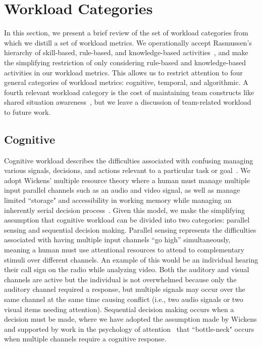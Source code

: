 \section{Workload Categories}

In this section, we present a brief review of the set of workload categories from which we distill a set of workload metrics.  We operationally accept Rasmussen's hierarchy of skill-based, rule-based, and knowledge-based activities~\cite{Rasmussen83}, and make the simplifying restriction of only considering rule-based and knowledge-based activities in our workload metrics.  This allows us to restrict attention to four general categories of workload metrics: cognitive, temporal, and algorithmic.  A fourth relevant workload category is the cost of maintaining team constructs like shared situation awareness~\cite{EliasFiore2011}, but we leave a discussion of team-related workload to future work.



\subsection{Cognitive}
Cognitive workload describes the difficulties associated with confusing managing various signals, decisions, and actions relevant to a particular task or goal~\cite{MorayEtAl91,lebiere2013cognitive,Goodrich2004,Chadwick2004}. We adopt Wickens' multiple resource theory where a human must manage multiple input parallel channels such as an audio and video signal, as well as manage limited ``storage" and accessibility in working memory while managing an inherently serial decision process~\cite{wickens2002multiple}. Given this model, we make the simplifying assumption that cognitive workload can be divided into two categories: parallel sensing and sequential decision making. Parallel sensing represents the difficulties associated with having multiple input channels ``go high'' simultaneously, meaning a human must use attentional resources to attend to complementary stimuli over different channels. An example of this would be an individual hearing their call sign on the radio while analyzing video. Both the auditory and visual channels are active but the individual is not overwhelmed because only the auditory channel required a response, but multiple signals may occur over the same channel at the same time causing conflict (i.e., two audio signals or two visual items needing attention). Sequential decision making occurs when a decision must be made, where we have adopted the assumption made by Wickens and supported by work in the psychology of attention~\cite{Pashler98} that ``bottle-neck" occurs when multiple channels require a cognitive response. 

